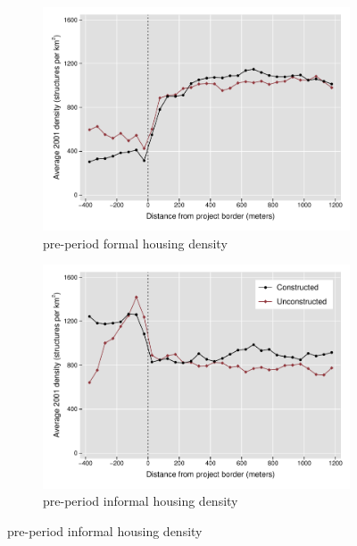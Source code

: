 \documentclass[12pt]{article}
\begin{document}
\begin{figure}[h!]
        \centering
        \caption[ Housing Densities in Constructed and Unconstructed Projects Areas ]
        {\small Housing Densities in Constructed and Unconstructed projects } 
        \begin{subfigure}[b]{0.495\textwidth}
            \centering
            \includegraphics[width=\textwidth,trim={0.3cm .3cm 0.1cm 0cm}, clip=true]{figures/bblu_for_pre_means}
            \caption[Network2]%
            {{\small pre-period formal housing density}}    
            \label{fig:prefor}
        \end{subfigure}
        \hfill
        \begin{subfigure}[b]{0.495\textwidth}  
            \centering 
            \includegraphics[width=\textwidth,trim={0.3cm .3cm 0.1cm 0cm}, clip=true]{figures/bblu_inf_pre_means}
            \caption[]%
            {{\small pre-period informal housing density}}    
            \label{fig:preinf}
        \end{subfigure}
        \label{fig:rawbblumeans}
        \vspace{-6mm}
    \end{figure} 
\end{document}
